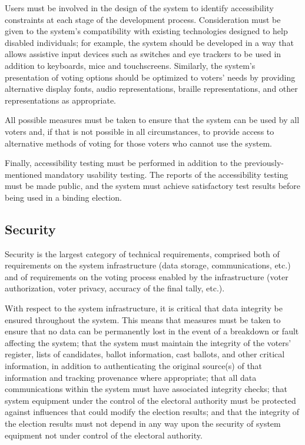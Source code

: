 Users must be involved in the design of the system to identify
accessibility constraints at each stage of the development
process. Consideration must be given to the system's compatibility
with existing technologies designed to help disabled individuals; for
example, the system should be developed in a way that allows assistive
input devices such as switches and eye trackers to be used in addition
to keyboards, mice and touchscreens. Similarly, the system's
presentation of voting options should be optimized to voters' needs by
providing alternative display fonts, audio representations, braille
representations, and other representations as appropriate.

All possible measures must be taken to ensure that the system can be
used by all voters and, if that is not possible in all circumstances,
to provide access to alternative methods of voting for those voters
who cannot use the system.

Finally, accessibility testing must be performed in addition to the
previously-mentioned mandatory usability testing. The reports of the
accessibility testing must be made public, and the system must achieve
satisfactory test results before being used in a binding election.

\subsection{Security}

Security is the largest category of technical requirements, comprised
both of requirements on the system infrastructure (data storage,
communications, etc.) and of requirements on the voting process
enabled by the infrastructure (voter authorization, voter privacy,
accuracy of the final tally, etc.).

With respect to the system infrastructure, it is critical that data
integrity be ensured throughout the system. This means that measures
must be taken to ensure that no data can be permanently lost in the
event of a breakdown or fault affecting the system; that the system
must maintain the integrity of the voters' register, lists of
candidates, ballot information, cast ballots, and other critical
information, in addition to authenticating the original source(s) of
that information and tracking provenance where appropriate; that all
data communications within the system must have associated integrity
checks; that system equipment under the control of the electoral
authority must be protected against influences that could modify the
election results; and that the integrity of the election results must
not depend in any way upon the security of system equipment not under
control of the electoral authority.

